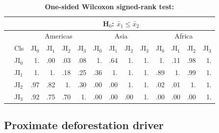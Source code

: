 			\begin{table}[ht]
				\centering
				\caption[One-sided Wilcoxon signed-rank test]{\textbf{One-sided Wilcoxon signed-rank test:}}
				\label{tab:wilcoxononesided}
				\begin{tabular}{llrrrrrrrrrrrr}
					\hline
					& & \multicolumn{12}{c}{H$_0$: $\tilde{x_1}\leq\tilde{x_2}$} \\\hline
					& & \multicolumn{4}{c}{Americas} & \multicolumn{4}{c}{Asia} & \multicolumn{4}{c}{Africa} \\
					& Cls & JI$_0$ & JI$_1$ & JI$_2$ & JI$_3$ & JI$_0$ & JI$_1$ & JI$_2$ & JI$_3$ & JI$_0$ & JI$_1$ & JI$_2$ & JI$_3$ \\\hline
					\multirow{4}{*}{\STAB{\rotatebox[origin=c]{90}{H$_0$: $\tilde{x_1}\geq\tilde{x_2}$}}} & JI$_0$ & 1. & .00 & .03 & .08 & 1. & .64 & 1. & 1. & 1. & .11 & .98 & 1. \\
					& JI$_1$ & 1. & 1. & .18 & .25 & .36 & 1. & 1. & 1. & .89 & 1. & .99 & 1. \\
					& JI$_2$ & .97 & .82 & 1. & .30 & .00 & .00 & 1. & 1. & .02 & .01 & 1. & 1. \\
					& JI$_3$ & .92 & .75 & .70 & 1. & .00 & .00 & .00 & 1. & .00 & .00 & .00 & 1. \\\hline
				\end{tabular}
			\end{table}

		\subsection{Proximate deforestation driver}
		\label{subsec:proxy_deforestation_driver}

